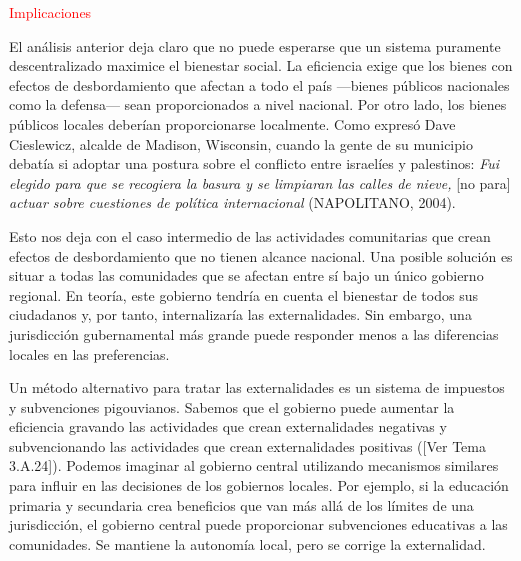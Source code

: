 \documentclass[10pt,a4paper]{article}
\newcommand{\authorfont}[1]{{\fontfamily{EBGaramond-TLF}\selectfont #1}}
\begin{document}
\textcolor{red}{Implicaciones}

El análisis anterior deja claro que no puede esperarse que un sistema puramente descentralizado maximice el bienestar social. La eficiencia exige que los bienes con efectos de desbordamiento que afectan a todo el país —bienes públicos nacionales como la defensa— sean proporcionados a nivel nacional. Por otro lado, los bienes públicos locales deberían proporcionarse localmente. Como expresó Dave Cieslewicz, alcalde de Madison, Wisconsin, cuando la gente de su municipio debatía si adoptar una postura sobre el conflicto entre israelíes y palestinos: \textit{Fui elegido para que se recogiera la basura y se limpiaran las calles de nieve, }[no para]\textit{ actuar sobre cuestiones de política internacional} (NAPOLITANO, 2004).

Esto nos deja con el caso intermedio de las actividades comunitarias que crean efectos de desbordamiento que no tienen alcance nacional. Una posible solución es situar a todas las comunidades que se afectan entre sí bajo un único gobierno regional. En teoría, este gobierno tendría en cuenta el bienestar de todos sus ciudadanos y, por tanto, internalizaría las externalidades. Sin embargo, una jurisdicción gubernamental más grande puede responder menos a las diferencias locales en las preferencias.

Un método alternativo para tratar las externalidades es un sistema de impuestos y subvenciones pigouvianos. Sabemos que el gobierno puede aumentar la eficiencia gravando las actividades que crean externalidades negativas y subvencionando las actividades que crean externalidades positivas ([\authorfont{Ver Tema 3.A.24}]). Podemos imaginar al gobierno central utilizando mecanismos similares para influir en las decisiones de los gobiernos locales. Por ejemplo, si la educación primaria y secundaria crea beneficios que van más allá de los límites de una jurisdicción, el gobierno central puede proporcionar subvenciones educativas a las comunidades. Se mantiene la autonomía local, pero se corrige la externalidad. 
\end{document}
